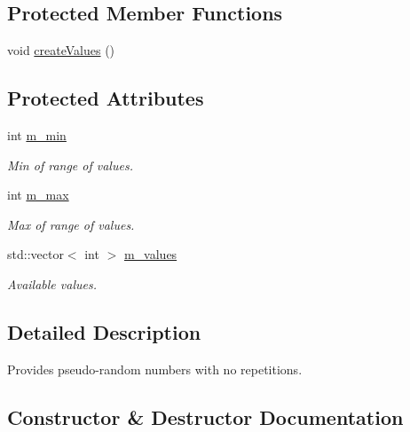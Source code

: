 \subsection*{Protected Member Functions}
\begin{DoxyCompactItemize}
\item 
void \mbox{\hyperlink{class_d_utils_1_1_random_1_1_unrepeated_randomizer_a583497053acec6991b9a872f924e8ccb}{create\+Values}} ()
\end{DoxyCompactItemize}
\subsection*{Protected Attributes}
\begin{DoxyCompactItemize}
\item 
int \mbox{\hyperlink{class_d_utils_1_1_random_1_1_unrepeated_randomizer_a7b59cc2afb7d7db20aa048ea95365134}{m\+\_\+min}}
\begin{DoxyCompactList}\small\item\em Min of range of values. \end{DoxyCompactList}\item 
int \mbox{\hyperlink{class_d_utils_1_1_random_1_1_unrepeated_randomizer_a5c2d23ba34589d23ac131e37feac6f6b}{m\+\_\+max}}
\begin{DoxyCompactList}\small\item\em Max of range of values. \end{DoxyCompactList}\item 
std\+::vector$<$ int $>$ \mbox{\hyperlink{class_d_utils_1_1_random_1_1_unrepeated_randomizer_adbe23146bfc61994e361d356282ce6c4}{m\+\_\+values}}
\begin{DoxyCompactList}\small\item\em Available values. \end{DoxyCompactList}\end{DoxyCompactItemize}


\subsection{Detailed Description}
Provides pseudo-\/random numbers with no repetitions. 

\subsection{Constructor \& Destructor Documentation}
\mbox{\label{class_d_utils_1_1_random_1_1_unrepeated_randomizer_ae073cba77da776dae607f22fd289b220}} 
